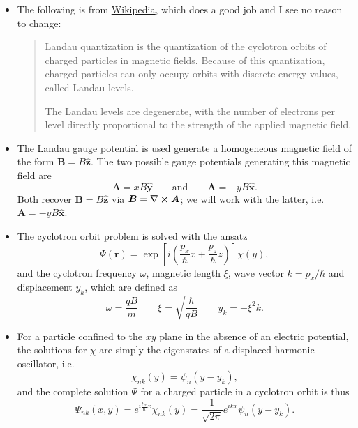 \documentclass[11pt, a4paper]{article}
\renewcommand{\curl}{\nabla \cross}
\newcommand{\eqtext}[1]{\qquad \text{#1} \qquad}
\renewcommand{\vec}[1]{\bm{#1}}  %
\newcommand{\uvec}[1]{\hat{\vec{#1}}}  %
\renewcommand{\r}{\vec{r}}  %
\newcommand{\A}{\vec{A}}  %
\newcommand{\B}{\vec{B}}  %
\renewcommand{\P}{\Psi}  %
\begin{document}
\begin{itemize}

    \item The following is from \href{https://en.wikipedia.org/wiki/Landau\_quantization}{\underline{Wikipedia}}, which does a good job and I see no reason to change:
    \begin{quote}
        Landau quantization is the quantization of the cyclotron orbits of charged particles in magnetic fields. Because of this quantization, charged particles can only occupy orbits with discrete energy values, called Landau levels. 

        The Landau levels are degenerate, with the number of electrons per level directly proportional to the strength of the applied magnetic field. 
    \end{quote}

    	\item The Landau gauge potential is used generate a homogeneous magnetic field of the form $ \B = B \uvec{z} $. The two possible gauge potentials generating this magnetic field are
	\begin{equation*}
		\A = x B \uvec{y} \eqtext{and} \A = - y B \uvec{x}.
	\end{equation*}
	Both recover $ \B = B \uvec{z} $ via $ \B = \curl \A $; we will work with the latter, i.e. $ \A = - y B \uvec{x} $.

    \item The cyclotron orbit problem is solved with the ansatz
    \begin{equation*}
		\P(\r) = \exp\left[i \left(\frac{p_{x}}{\hbar}x + \frac{p_{z}}{\hbar}z \right)\right]\chi(y),
    \end{equation*}
    and the cyclotron frequency $ \omega $, magnetic length $ \xi $, wave vector $ k = p_{x}/\hbar $ and displacement $ y_{k} $, which are defined as
    \begin{equation*}
        \omega = \frac{q B}{m} \qquad \xi = \sqrt{\frac{\hbar}{qB}} \qquad y_{k} = - \xi^{2}k.
    \end{equation*}

	\item For a particle confined to the $ xy $ plane in the absence of an electric potential, the solutions for $ \chi $ are simply the eigenstates of a displaced harmonic oscillator, i.e.
	\begin{equation*}
		\chi_{nk}(y) = \psi_{n}(y - y_{k}),
	\end{equation*}
	and the complete solution $ \Psi $ for a charged particle in a cyclotron orbit is thus
	\begin{equation*}
		\P_{nk}(x, y) = e^{i\frac{p_{x}}{\hbar}x}\chi_{nk}(y) = \frac{1}{\sqrt{2\pi}}e^{ikx} \psi_{n}(y - y_{k}).
	\end{equation*}


\end{itemize}
\end{document}
